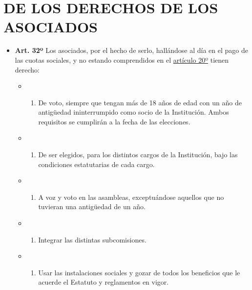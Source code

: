 \documentclass[]{book}
\providecommand{\tightlist}{%
  \setlength{\itemsep}{0pt}\setlength{\parskip}{0pt}}
\begin{document}
\hypertarget{cap4}{%
\chapter{DE LOS DERECHOS DE LOS ASOCIADOS}\label{cap4}}

\begin{itemize}
\tightlist
\item
  \textbf{Art. 32º}
  Los asociados, por el hecho de serlo, hallándose al día en el pago de las cuotas sociales, y no estando comprendidos en el \protect\hyperlink{art20}{artículo 20º} tienen derecho:

  \begin{itemize}
  \item
    \begin{enumerate}
    \def\labelenumi{\alph{enumi})}
    \tightlist
    \item
      De voto, siempre que tengan más de 18 años de edad con un año de antigüedad ininterrumpido como socio de la Institución. Ambos requisitos se cumplirán a la fecha de las elecciones.
    \end{enumerate}
  \item
    \begin{enumerate}
    \def\labelenumi{\alph{enumi})}
    \setcounter{enumi}{1}
    \tightlist
    \item
      De ser elegidos, para los distintos cargos de la Institución, bajo las condiciones estatutarias de cada cargo.
    \end{enumerate}
  \item
    \begin{enumerate}
    \def\labelenumi{\alph{enumi})}
    \setcounter{enumi}{2}
    \tightlist
    \item
      A voz y voto en las asambleas, exceptuándose aquellos que no tuvieran una antigüedad de un año.
    \end{enumerate}
  \item
    \begin{enumerate}
    \def\labelenumi{\alph{enumi})}
    \setcounter{enumi}{3}
    \tightlist
    \item
      Integrar las distintas subcomisiones.
    \end{enumerate}
  \item
    \begin{enumerate}
    \def\labelenumi{\alph{enumi})}
    \setcounter{enumi}{4}
    \tightlist
    \item
      Usar las instalaciones sociales y gozar de todos los beneficios que le acuerde el Estatuto y reglamentos en vigor.

\end{enumerate}
\end{itemize}
\end{itemize}
\end{document}
